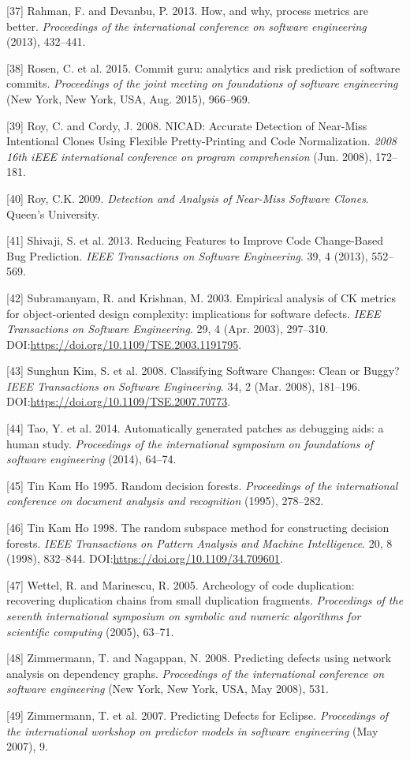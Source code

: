 \documentclass[sigconf]{acmart}
\begin{document}
[37] Rahman, F. and Devanbu, P. 2013. How, and why, process metrics
are better. \emph{Proceedings of the international conference on
software engineering} (2013), 432--441.


[38] Rosen, C. et al. 2015. Commit guru: analytics and risk
prediction of software commits. \emph{Proceedings of the joint meeting
on foundations of software engineering} (New York, New York, USA, Aug.
2015), 966--969.


[39] Roy, C. and Cordy, J. 2008. NICAD: Accurate Detection of
Near-Miss Intentional Clones Using Flexible Pretty-Printing and Code
Normalization. \emph{2008 16th iEEE international conference on program
comprehension} (Jun. 2008), 172--181.


[40] Roy, C.K. 2009. \emph{Detection and Analysis of Near-Miss
Software Clones}. Queen's University.


[41] Shivaji, S. et al. 2013. Reducing Features to Improve Code
Change-Based Bug Prediction. \emph{IEEE Transactions on Software
Engineering}. 39, 4 (2013), 552--569.


[42] Subramanyam, R. and Krishnan, M. 2003. Empirical analysis of CK
metrics for object-oriented design complexity: implications for software
defects. \emph{IEEE Transactions on Software Engineering}. 29, 4 (Apr.
2003), 297--310. DOI:\url{https://doi.org/10.1109/TSE.2003.1191795}.


[43] Sunghun Kim, S. et al. 2008. Classifying Software Changes:
Clean or Buggy? \emph{IEEE Transactions on Software Engineering}. 34, 2
(Mar. 2008), 181--196. DOI:\url{https://doi.org/10.1109/TSE.2007.70773}.


[44] Tao, Y. et al. 2014. Automatically generated patches as
debugging aids: a human study. \emph{Proceedings of the international
symposium on foundations of software engineering} (2014), 64--74.


[45] Tin Kam Ho 1995. Random decision forests. \emph{Proceedings of
the international conference on document analysis and recognition}
(1995), 278--282.


[46] Tin Kam Ho 1998. The random subspace method for constructing
decision forests. \emph{IEEE Transactions on Pattern Analysis and
Machine Intelligence}. 20, 8 (1998), 832--844.
DOI:\url{https://doi.org/10.1109/34.709601}.


[47] Wettel, R. and Marinescu, R. 2005. Archeology of code
duplication: recovering duplication chains from small duplication
fragments. \emph{Proceedings of the seventh international symposium on
symbolic and numeric algorithms for scientific computing} (2005),
63--71.


[48] Zimmermann, T. and Nagappan, N. 2008. Predicting defects using
network analysis on dependency graphs. \emph{Proceedings of the
international conference on software engineering} (New York, New York,
USA, May 2008), 531.


[49] Zimmermann, T. et al. 2007. Predicting Defects for Eclipse.
\emph{Proceedings of the international workshop on predictor models in
software engineering} (May 2007), 9.




\end{document}
